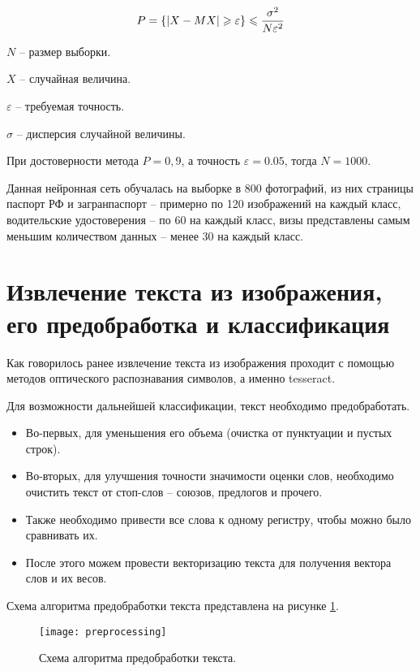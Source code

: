 \begin{equation}
	\centering
	P = \{|X-MX| \geq \varepsilon\}\leq \frac{\sigma^2}{N\varepsilon^2}
	\label{eq:cheb}
\end{equation}

$N$ -- размер выборки.

$X$ -- случайная величина.

$\varepsilon$ -- требуемая точность.

$\sigma$ -- дисперсия случайной величины.

При достоверности метода $P= 0,9$, а точность $\varepsilon=0.05$, тогда $N=1000$.

Данная нейронная сеть обучалась на выборке в 800 фотографий, из них страницы паспорт РФ и загранпаспорт -- примерно по 120 изображений на каждый класс, водительские удостоверения -- по 60 на каждый класс, визы представлены самым меньшим количеством данных -- менее 30 на каждый класс.

\section{Извлечение текста из изображения, его предобработка и классификация}

Как говорилось ранее извлечение текста из изображения проходит с помощью методов оптического распознавания символов, а именно tesseract.

Для возможности дальнейшей классификации, текст необходимо предобработать.

\begin{itemize}
\item Во-первых, для уменьшения его объема (очистка от пунктуации и пустых строк).
\item Во-вторых, для улучшения точности значимости оценки слов, необходимо очистить текст от стоп-слов -- союзов, предлогов и прочего.
\item Также необходимо привести все слова к одному регистру, чтобы можно было сравнивать их.
\item После этого можем провести векторизацию текста для получения вектора слов и их весов.
\end{itemize}

Схема алгоритма предобработки текста представлена на рисунке \ref{img:preprocessing}.

\begin{figure}[H]
	\centering
	\texttt{[image: preprocessing]}
	\caption{Схема алгоритма предобработки текста. }
	\label{img:preprocessing}
\end{figure}

